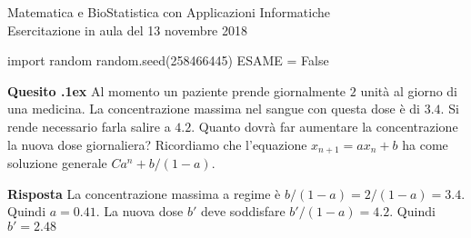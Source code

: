 \documentclass[11pt,twoside,a4paper]{article}
\newcounter{quesito}
\newenvironment{question}{\addtocounter{quesito}{1}\par\textbf{Quesito \thequesito.\kern1ex}}{\vspace{0.5\parskip}}
\newenvironment{answer}{\par\textbf{Risposta\quad}}{\vspace{\parskip}}
\begin{document}
\colorbox{blue!10}{\begin{minipage}{\textwidth}
Matematica e BioStatistica con Applicazioni Informatiche\\
Esercitazione in aula del 13 novembre 2018
\end{minipage}}


\begin{pycode}
import random
random.seed(258466445)
ESAME = False
\end{pycode}



\begin{question}
Al momento un paziente prende giornalmente $2$ unità al giorno di una medicina. La concentrazione massima nel sangue con questa dose è di $3.4$. Si rende necessario farla salire a $4.2$. Quanto dovrà far aumentare la concentrazione la nuova dose giornaliera? Ricordiamo che l'equazione $x_{n+1}=ax_n +b$ ha come soluzione generale $Ca^n+b/(1-a)$.
\begin{answer}
La concentrazione massima a regime è $b/(1-a)=2/(1-a)=3.4$. Quindi $a=0.41$. La nuova dose $b'$ deve soddisfare $b'/(1-a)=4.2$. Quindi {\color{blue}$b'=2.48$}
\end{answer}
\end{question}
\end{document}
